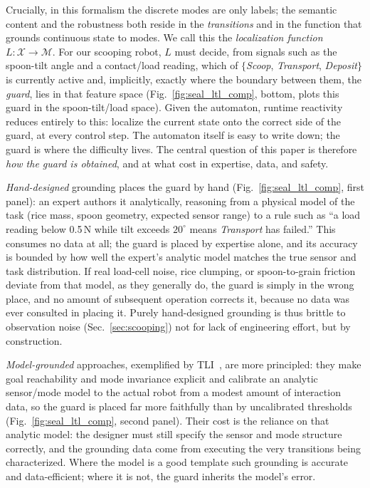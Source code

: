 Crucially, in this formalism the discrete modes are only labels; the semantic content and the robustness both reside in the \emph{transitions} and in the function that grounds continuous state to modes. We call this the \emph{localization function} $L:\mathcal{X}\!\to\!\mathcal{M}$. For our scooping robot, $L$ must decide, from signals such as the spoon-tilt angle and a contact/load reading, which of $\{$\textit{Scoop}, \textit{Transport}, \textit{Deposit}$\}$ is currently active and, implicitly, exactly where the boundary between them, the \emph{guard}, lies in that feature space (Fig.~\ref{fig:seal_ltl_comp}, bottom, plots this guard in the spoon-tilt/load space). Given the automaton, runtime reactivity reduces entirely to this: localize the current state onto the correct side of the guard, at every control step. The automaton itself is easy to write down; the guard is where the difficulty lives. The central question of this paper is therefore \emph{how the guard is obtained}, and at what cost in expertise, data, and safety.

\emph{Hand-designed} grounding places the guard by hand (Fig.~\ref{fig:seal_ltl_comp}, first panel): an expert authors it analytically, reasoning from a physical model of the task (rice mass, spoon geometry, expected sensor range) to a rule such as ``a load reading below 0.5\,N while tilt exceeds $20^\circ$ means \textit{Transport} has failed.'' This consumes no data at all; the guard is placed by expertise alone, and its accuracy is bounded by how well the expert's analytic model matches the true sensor and task distribution. If real load-cell noise, rice clumping, or spoon-to-grain friction deviate from that model, as they generally do, the guard is simply in the wrong place, and no amount of subsequent operation corrects it, because no data was ever consulted in placing it. Purely hand-designed grounding is thus brittle to observation noise (Sec.~\ref{sec:scooping}) not for lack of engineering effort, but by construction.

\emph{Model-grounded} approaches, exemplified by TLI~\cite{wang2022temporal}, are more principled: they make goal reachability and mode invariance explicit and calibrate an analytic sensor/mode model to the actual robot from a modest amount of interaction data, so the guard is placed far more faithfully than by uncalibrated thresholds (Fig.~\ref{fig:seal_ltl_comp}, second panel). Their cost is the reliance on that analytic model: the designer must still specify the sensor and mode structure correctly, and the grounding data come from executing the very transitions being characterized. Where the model is a good template such grounding is accurate and data-efficient; where it is not, the guard inherits the model's error.

